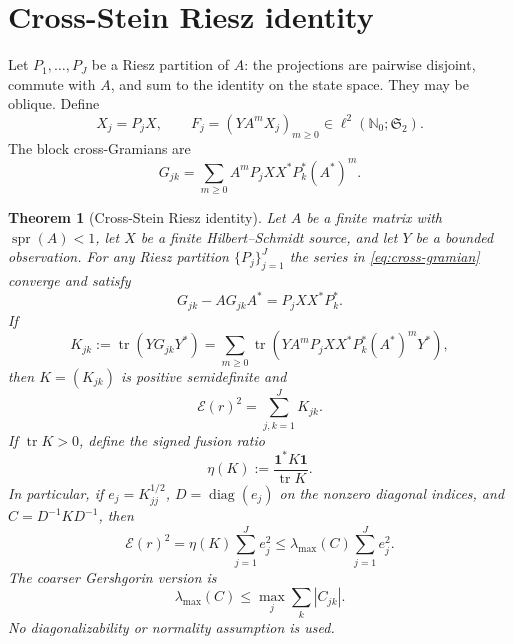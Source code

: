 \documentclass[11pt]{article}
\newtheorem{theorem}{Theorem}[section]
\theoremstyle{remark}
\newcommand{\HS}{\mathfrak S_2}
\newcommand{\cE}{\mathcal E}
\newcommand{\tr}{\operatorname{tr}}
\newcommand{\spr}{\operatorname{spr}}
\begin{document}
\section{Cross-Stein Riesz identity}
\label{sec:identity}

Let $P_1,\ldots,P_J$ be a Riesz partition of $A$: the projections are
pairwise disjoint, commute with $A$, and sum to the identity on the state
space.  They may be oblique.  Define
\begin{equation}
 X_j=P_jX,\qquad F_j=(YA^mX_j)_{m\ge0}\in\ell^2(\mathbb N_0;\HS).
 \label{eq:block-response}
\end{equation}
The block cross-Gramians are
\begin{equation}
 G_{jk}=\sum_{m\ge0}A^mP_jXX^*P_k^*(A^*)^m.
 \label{eq:cross-gramian}
\end{equation}

\begin{theorem}[Cross-Stein Riesz identity]
\label{thm:cross-stein}
Let $A$ be a finite matrix with $\spr(A)<1$, let $X$ be a finite
Hilbert--Schmidt source, and let $Y$ be a bounded observation.  For any
Riesz partition $\{P_j\}_{j=1}^J$ the series in \eqref{eq:cross-gramian}
converge and satisfy
\begin{equation}
 G_{jk}-AG_{jk}A^*=P_jXX^*P_k^*.
 \label{eq:cross-stein}
\end{equation}
If
\begin{equation}
 K_{jk}:=\tr(YG_{jk}Y^*)
       =\sum_{m\ge0}\tr\!\left(
          YA^mP_jXX^*P_k^*(A^*)^mY^*
        \right),
 \label{eq:block-gram}
\end{equation}
then $K=(K_{jk})$ is positive semidefinite and
\begin{equation}
 \boxed{\cE(r)^2=\sum_{j,k=1}^J K_{jk}.}
 \label{eq:exact-quadratic}
\end{equation}
If $\tr K>0$, define the signed fusion ratio
\begin{equation}
 \eta(K):=\frac{\mathbf 1^*K\mathbf 1}{\tr K}.
 \label{eq:fusion-ratio}
\end{equation}
In particular, if $e_j=K_{jj}^{1/2}$, $D=\operatorname{diag}(e_j)$ on the
nonzero diagonal indices, and $C=D^{-1}KD^{-1}$, then
\begin{equation}
 \boxed{
 \cE(r)^2=\eta(K)\sum_{j=1}^J e_j^2
 \le \lambda_{\max}(C)\sum_{j=1}^J e_j^2.}
 \label{eq:coherence-bound}
\end{equation}
The coarser Gershgorin version is
\begin{equation}
 \lambda_{\max}(C)\le\max_j\sum_k|C_{jk}|.
 \label{eq:gershgorin}
\end{equation}
No diagonalizability or normality assumption is used.
\end{theorem}
\end{document}
